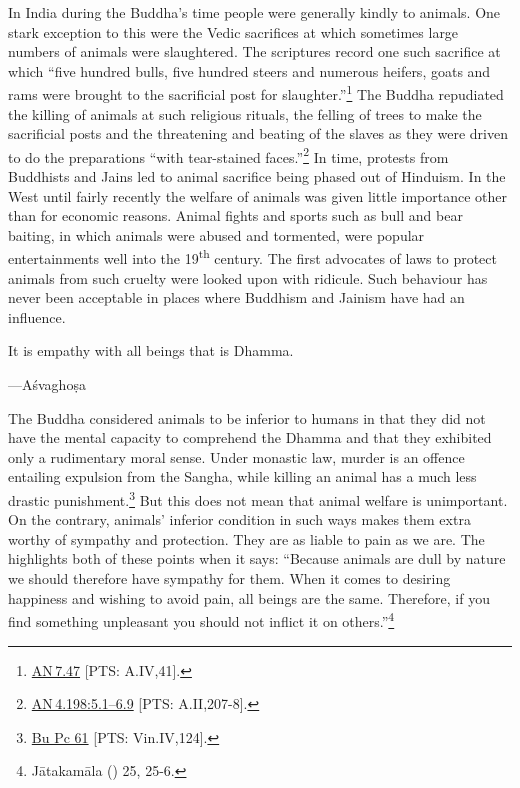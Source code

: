 \documentclass[10pt, openright]{book}
\newenvironment{epigram-2}%
{%
\setstretch{1.4}
\vspace{1em}
\noindent
\quoting[leftmargin=2cm,rightmargin=2cm]%
\begin{itshape}
\large
}%
{\end{itshape}\endquoting
}%
\newenvironment{epigram-2-cite}%
{%
\quoting[leftmargin=2cm,rightmargin=2cm]%
\noindent\normal\hspace*{\fill} 
}%
{\endquoting
}%
\begin{document}
In India during the Buddha’s time people were generally kindly to animals. One stark exception to this were the Vedic sacrifices at which sometimes large numbers of animals were slaughtered. The scriptures record one such sacrifice at which “five hundred bulls, five hundred steers and numerous heifers, goats and rams were brought to the sacrificial post for slaughter.”\footnote {\href{https://suttacentral.net/an7.47/en/sujato}{AN 7.47} [PTS: A.IV,41].} The Buddha repudiated the killing of animals at such religious rituals, the felling of trees to make the sacrificial posts and the threatening and beating of the slaves as they were driven to do the preparations “with tear-stained faces.”\footnote {\href{https://suttacentral.net/an4.198/en/sujato\#5.1}{AN 4.198:5.1–6.9} [PTS: A.II,207-8].} In time, protests from Buddhists and Jains led to animal sacrifice being phased out of Hinduism. In the West until fairly recently the welfare of animals was given little importance other than for economic reasons. Animal fights and sports such as bull and bear baiting, in which animals were abused and tormented, were popular entertainments well into the 19\textsuperscript{th} century. The first advocates of laws to protect animals from such cruelty were looked upon with ridicule. Such behaviour has never been acceptable in places where Buddhism and Jainism have had an influence.


\begin{epigram-2}
It is empathy with all beings that is Dhamma.
\end{epigram-2}
\begin{epigram-2-cite}
—Aśvaghoṣa
\end{epigram-2-cite}

The Buddha considered animals to be inferior to humans in that they did not have the mental capacity to comprehend the Dhamma and that they exhibited only a rudimentary moral sense. Under monastic law, murder is an offence entailing expulsion from the Sangha, while killing an animal has a much less drastic punishment.\footnote {\href{https://suttacentral.net/pli-tv-bu-vb-pc61/en/brahmali}{Bu Pc 61} [PTS: Vin.IV,124].} But this does not mean that animal welfare is unimportant. On the contrary, animals’ inferior condition in such ways makes them extra worthy of sympathy and protection. They are as liable to pain as we are. The \cite{Jātakamāla} highlights both of these points when it says: “Because animals are dull by nature we should therefore have sympathy for them. When it comes to desiring happiness and wishing to avoid pain, all beings are the same. Therefore, if you find something unpleasant you should not inflict it on others.”\footnote {Jātakamāla (\cite{Speyer 1895a}) 25, 25-6.}
\end{document}
